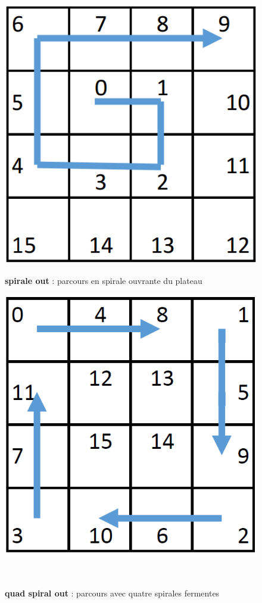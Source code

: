 	\begin{figure}[H]
		\includegraphics[width=\linewidth]{images/parcours_spiral-out.png}
		\caption{\textbf{spirale out} : parcours en spirale ouvrante du plateau}\label{fig:parcours_spiral-out}
		\endminipage\hfill
		\includegraphics[width=\linewidth]{images/parcours_quad-spiral-in.png}
		\caption{\textbf{quad spiral out} : parcours avec quatre spirales fermentes}\label{fig:quad-spiral-in}
		\endminipage\hfill
		\ %
		\endminipage\hfill
	\end{figure}
	
